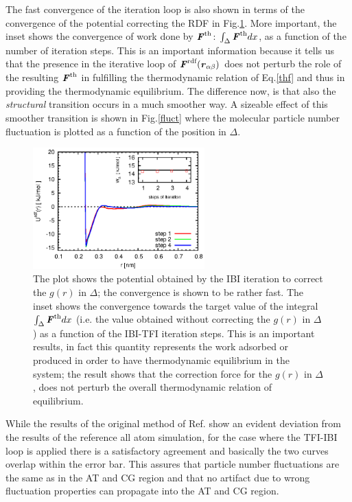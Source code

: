 \documentclass[aps,pre,preprint]{revtex4}
\renewcommand{\v}[1]{\textbf{\textit{#1}}}
\begin{document}
The fast convergence of the iteration loop is also shown in terms of the convergence of the potential correcting the RDF in Fig.\ref{gpot}. More important, the inset shows the convergence of work done by ${\v F}^{\textrm{th}}$: $\int_{\Delta}{\v F}^{\textrm{th}}dx$, as a function of the number of iteration steps. This is an important information because it tells us that the presence in the iterative loop of $\v F^{\textrm{rdf}}(\v r_{\alpha\beta})$ does not perturb the role of the resulting ${\v F}^{\textrm{th}}$ in fulfilling the thermodynamic relation of Eq.\ref{thf} and thus in providing the thermodynamic equilibrium. The difference now, is that also the {\it structural} transition occurs in a much smoother way. A sizeable effect of this smoother transition is shown in Fig.\ref{fluct} where the molecular particle number fluctuation is plotted as a function of the position in $\Delta$.
\begin{figure}
  \centering
  \includegraphics[width=0.59\textwidth]{force-rdf.eps}
  \caption{The plot shows the potential obtained by the IBI iteration to correct the $g(r)$ in $\Delta$; the convergence is shown to be rather fast. The inset shows the convergence towards the target value of the integral $\int_{\Delta}{\v F}^{\textrm{th}}dx$ (i.e. the value obtained without correcting the $g(r)$ in $\Delta$) as a function of the IBI-TFI iteration steps. This is an important results, in fact this quantity represents the work adsorbed or produced in order to have thermodynamic equilibrium in the system; the result shows that the correction force for the $g(r)$ in $\Delta$, does not perturb the overall thermodynamic relation of equilibrium.}
  \label{gpot}
\end{figure}
While the results of the original method of Ref.\cite{prlgc} show an evident deviation from the results of the reference all atom simulation, for the case where the TFI-IBI loop is applied there is a satisfactory agreement and basically the two curves overlap within the error bar. This assures that particle number fluctuations are the same as in the AT and CG region and that no artifact due to wrong fluctuation properties can propagate into the AT and CG region.
\end{document}
